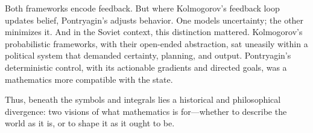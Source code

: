 Both frameworks encode feedback. But where Kolmogorov’s feedback loop updates belief, Pontryagin’s adjusts behavior. One models uncertainty; the other minimizes it. And in the Soviet context, this distinction mattered. Kolmogorov’s probabilistic frameworks, with their open-ended abstraction, sat uneasily within a political system that demanded certainty, planning, and output. Pontryagin’s deterministic control, with its actionable gradients and directed goals, was a mathematics more compatible with the state.

Thus, beneath the symbols and integrals lies a historical and philosophical divergence: two visions of what mathematics is for—whether to describe the world as it is, or to shape it as it ought to be.